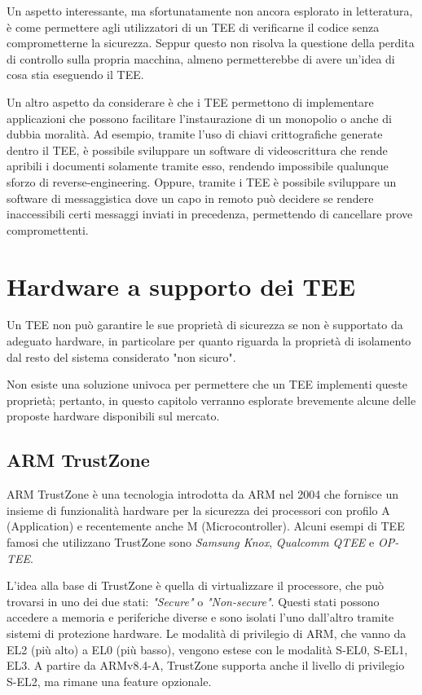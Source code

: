 \documentclass[12pt,italian]{report}
\begin{document}
Un aspetto interessante, ma sfortunatamente non ancora esplorato
in letteratura, è come permettere agli utilizzatori di un TEE di
verificarne il codice senza comprometterne la sicurezza.
Seppur questo non risolva la questione della perdita di controllo sulla
propria macchina, almeno permetterebbe di avere un'idea di cosa stia
eseguendo il TEE.

Un altro aspetto da considerare è che i TEE permettono di implementare
applicazioni che possono facilitare l'instaurazione di un monopolio
o anche di dubbia moralità.
Ad esempio, tramite l'uso di chiavi crittografiche generate dentro
il TEE, è possibile sviluppare un software di videoscrittura che
rende apribili i documenti solamente tramite esso, rendendo impossibile
qualunque sforzo di reverse-engineering. 
Oppure, tramite i TEE è possibile sviluppare un software di messaggistica
dove un capo in remoto può decidere se rendere inaccessibili certi messaggi
inviati in precedenza, permettendo di cancellare prove compromettenti.

\chapter{Hardware a supporto dei TEE}
\label{chap:hardware-supporto-tee}
Un TEE non può garantire le sue proprietà di sicurezza se non è supportato
da adeguato hardware, in particolare per quanto riguarda la proprietà di
isolamento dal resto del sistema considerato "non sicuro".

Non esiste una soluzione univoca per permettere che un TEE implementi
queste proprietà; pertanto, in questo capitolo verranno esplorate
brevemente alcune delle proposte hardware disponibili sul mercato.

\section{ARM TrustZone}
\label{sec:arm-trustzone}
ARM TrustZone\cite{trustzone} è una tecnologia introdotta da ARM nel 2004 che
fornisce un insieme di funzionalità hardware per la sicurezza
dei processori con profilo A (Application) e recentemente
anche M (Microcontroller).
Alcuni esempi di TEE famosi che utilizzano TrustZone sono
\textit{Samsung Knox}, \textit{Qualcomm QTEE} e \textit{OP-TEE}.

L'idea alla base di TrustZone è quella di virtualizzare il
processore, che può trovarsi in uno dei due stati:
\emph{"Secure"} o \emph{"Non-secure"}.
Questi stati possono accedere a memoria e periferiche diverse
e sono isolati l'uno dall'altro tramite sistemi di protezione
hardware.
Le modalità di privilegio di ARM, che vanno da EL2 (più alto)
a EL0 (più basso), vengono estese con le modalità
S-EL0, S-EL1, EL3.
A partire da ARMv8.4-A, TrustZone supporta anche il livello
di privilegio S-EL2, ma rimane una feature opzionale.
\end{document}
